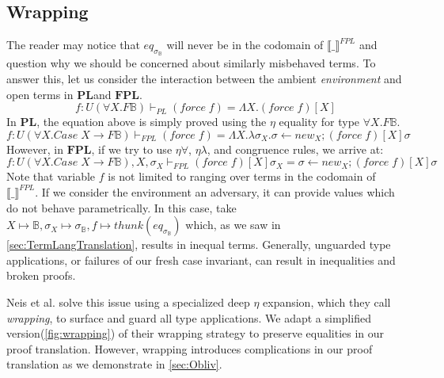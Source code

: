 \documentclass[acmsmall]{acmart}
\newcommand{\den}[1]{\llbracket #1\rrbracket}
\newcommand{\eric}[1]{\textcolor{red}{ <eric-#1> }}
\newcommand{\pl}{$\mathbf{PL}$}
\newcommand{\fpl}{$\mathbf{FPL}$}
\begin{document}
\subsection{Wrapping}\label{sec:Wrap}
The reader may notice that $eq_{\sigma_{\mathbb{B}}}$ will never be in the codomain of $\den{\_}^{FPL}$ and question why we should be concerned about similarly misbehaved terms. To answer this, let us consider the interaction between the ambient \emph{environment} and open terms in \pl\;and \fpl.
\[
  f : U(\forall X.F \mathbb{B}) \vdash_{PL} (force\;f) = \Lambda X. (force\;f)[X]
\]
In \pl, the equation above is simply proved using the $\eta$ equality for type $\forall X. F \mathbb{B}$. 
\[
  f : U(\forall X.Case\;X \to F \mathbb{B}) \vdash_{FPL} (force\;f) = \Lambda X. \lambda \sigma_X. \sigma \leftarrow new_X;(force\;f)[X]\sigma
\]
However, in \fpl, if we try to use $\eta\forall$, $\eta\lambda$, and congruence rules, we arrive at: 
\[
  f : U(\forall X.Case\;X \to F \mathbb{B}),X,\sigma_X \vdash_{FPL} (force\;f)[X]\sigma_X = \sigma \leftarrow new_X;(force\;f)[X]\sigma
\]
Note that variable $f$ is not limited to ranging over terms in the codomain of $\den{\_}^{FPL}$. If we consider the environment an adversary, it can provide values which do not behave parametrically. In this case, take $X\mapsto \mathbb{B}, \sigma_X \mapsto \sigma_\mathbb{B}, f \mapsto thunk(eq_{\sigma_{\mathbb{B}}})$ which, as we saw in \cref{sec:TermLangTranslation}, results in inequal terms.
Generally, unguarded type applications, or failures of our fresh case invariant, can result in inequalities and broken proofs.

Neis et al.\cite{NonParam} solve this issue using a specialized deep $\eta$ expansion, which they call \emph{wrapping}, to surface and guard all type applications. We adapt a simplified version(\cref{fig:wrapping}) of their wrapping strategy to preserve equalities in our proof translation. However, wrapping introduces complications in our proof translation as we demonstrate in \cref{sec:Obliv}.
\end{document}
